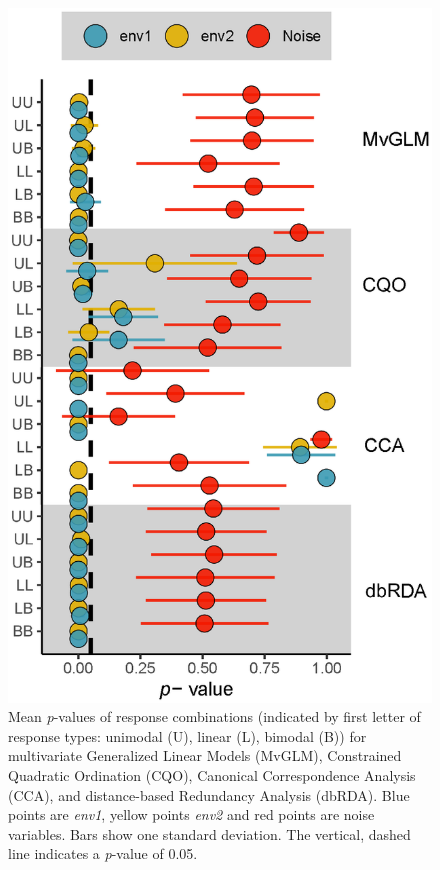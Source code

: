 \documentclass[a4paper,11pt]{article}
\begin{document}
    \begin{figure}
        \centering
        \includegraphics[scale = 0.7]{190912_error_bar}
        \caption{Mean \textit{p}-values of response combinations (indicated by first letter of response types: unimodal (U), linear (L), bimodal (B)) for multivariate Generalized Linear Models (MvGLM), Constrained Quadratic Ordination (CQO), Canonical Correspondence Analysis (CCA), and distance-based Redundancy Analysis (dbRDA). Blue points are \textit{env1}, yellow points \textit{env2} and red points are noise variables. Bars show one standard deviation. The vertical, dashed line indicates a \textit{p}-value of 0.05.}
        \label{fig:result1::p-valueComparison}
    \end{figure}
    
\end{document}
